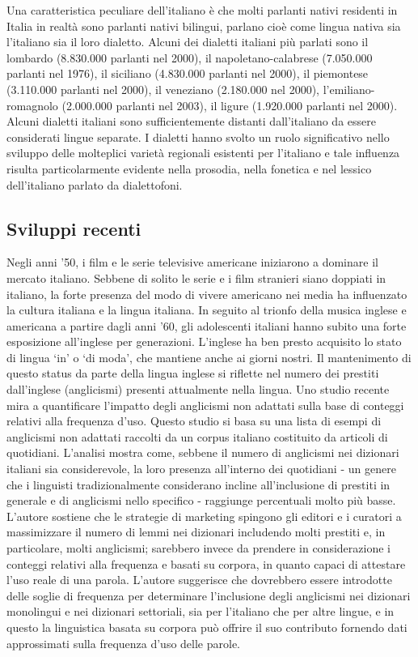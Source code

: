 \documentclass[]{../../metanetpaper}
\begin{document}
\begin{multicols}{2}
Una caratteristica peculiare dell'italiano \`{e} che molti parlanti nativi
residenti in Italia in realt\`{a} sono parlanti nativi bilingui, parlano
cio\`{e} come lingua nativa sia l'italiano sia il loro dialetto. Alcuni dei
dialetti italiani pi\`{u} parlati sono il lombardo (8.830.000 parlanti nel
2000), il napoletano-calabrese (7.050.000 parlanti nel 1976), il siciliano
(4.830.000 parlanti nel 2000), il piemontese (3.110.000 parlanti nel 2000), il
veneziano (2.180.000 nel 2000), l'emiliano-romagnolo (2.000.000 parlanti nel
2003), il ligure (1.920.000 parlanti nel 2000). Alcuni dialetti italiani sono
sufficientemente distanti dall'italiano da essere considerati lingue
separate. I dialetti hanno svolto un ruolo significativo nello sviluppo delle
molteplici variet\`{a} regionali esistenti per l'italiano e tale influenza
risulta particolarmente evidente nella prosodia, nella fonetica e nel lessico
dell'italiano parlato da dialettofoni.

\subsection{Sviluppi recenti}

Negli anni '50, i film e le serie televisive americane iniziarono a dominare
il mercato italiano. Sebbene di solito le serie e i film stranieri siano
doppiati in italiano, la forte presenza del modo di vivere americano nei media
ha influenzato la cultura italiana e la lingua italiana. In seguito al trionfo
della musica inglese e americana a partire dagli anni '60, gli adolescenti
italiani hanno subito una forte esposizione all'inglese per
generazioni. L'inglese ha ben presto acquisito lo stato di lingua `in' o `di
moda', che mantiene anche ai giorni nostri.
Il mantenimento di questo status da parte della lingua inglese si riflette nel
numero dei prestiti dall'inglese (anglicismi) presenti attualmente nella
lingua. Uno studio recente \cite{Fischer} mira a quantificare l'impatto degli
anglicismi non adattati sulla base di conteggi relativi alla frequenza d'uso. 
Questo studio si basa su una lista di esempi di anglicismi non adattati
raccolti da un corpus italiano costituito da articoli di quotidiani. L'analisi
mostra come, sebbene il numero di anglicismi nei dizionari italiani sia
considerevole, la loro presenza all'interno dei quotidiani - un genere che i
linguisti tradizionalmente considerano incline all'inclusione di prestiti in
generale e di anglicismi nello specifico - raggiunge percentuali molto pi\`{u}
basse. L'autore sostiene che le strategie di marketing spingono gli editori e
i curatori a massimizzare il numero di lemmi nei dizionari includendo molti
prestiti e, in particolare, molti anglicismi; sarebbero invece da prendere in
considerazione i conteggi relativi alla frequenza e basati su corpora, in
quanto capaci di attestare l'uso reale di una parola. L'autore suggerisce che
dovrebbero essere introdotte delle soglie di frequenza per determinare
l'inclusione degli anglicismi nei dizionari monolingui e nei dizionari
settoriali, sia per l'italiano che per altre lingue, e in questo la
linguistica basata su corpora pu\`{o} offrire il suo contributo fornendo dati
approssimati sulla frequenza d'uso delle parole.




\end{multicols}
\end{document}
